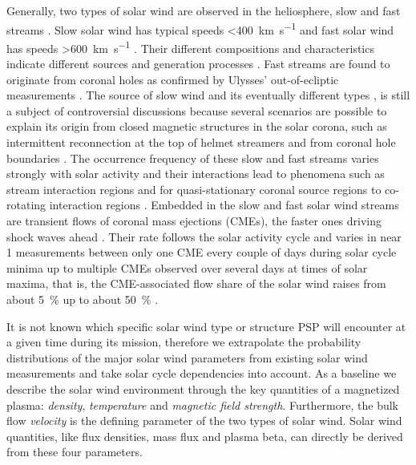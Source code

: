 Generally, two types of solar wind are observed in the heliosphere, slow and fast streams \citep{Neugebauer1966,Schwenn1983}. Slow solar wind has typical speeds \SI{<400}{\km\per\s} and fast solar wind has speeds \SI{>600}{\km\per\s} \citep[p.~144]{Schwenn1990}. Their different compositions and characteristics indicate different sources and generation processes \citep{McGregor2011a}. Fast streams are found to originate from coronal holes as confirmed by Ulysses' out-of-ecliptic measurements \citep{McComas1998}. The source of slow wind and its eventually different types \citep{Schwenn1983}, is still a subject of controversial discussions because several scenarios are possible to explain its origin from closed magnetic structures in the solar corona, such as intermittent reconnection at the top of helmet streamers and from coronal hole boundaries \citep{Kilpua2016}. The occurrence frequency of these slow and fast streams varies strongly with solar activity and their interactions lead to phenomena such as stream interaction regions and for quasi-stationary coronal source regions to co-rotating interaction regions \citep{Balogh1999}.
Embedded in the slow and fast solar wind streams are transient flows of coronal mass ejections (CMEs), the faster ones driving shock waves ahead \citep{Gosling1974}. Their rate follows the solar activity cycle and varies in near \SI{1}{\au} measurements between only one CME every couple of days during solar cycle minima up to multiple CMEs observed over several days at times of solar maxima, that is, the CME-associated flow share of the solar wind raises from about \SI{5}{\percent} up to about \SI{50}{\percent} \citep{Richardson2012}.

It is not known which specific solar wind type or structure PSP will encounter at a given time during its mission, therefore we extrapolate the probability distributions of the major solar wind parameters from existing solar wind measurements and take solar cycle dependencies into account.
As a baseline we describe the solar wind environment through the key quantities of a magnetized plasma: \textit{density}, \textit{temperature} and \textit{magnetic field strength}. Furthermore, the bulk flow \textit{velocity} is the defining parameter of the two types of solar wind. Solar wind quantities, like flux densities, mass flux and plasma beta, can directly be derived from these four parameters.

